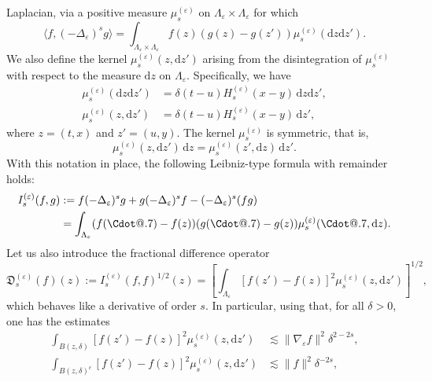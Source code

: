 \documentclass{article}
\makeatletter
\numberwithin{equation}{section}
\newcommand{\assign}{:=}
\newcommand{\mathd}{\mathrm{d}}
\newcommand*\Cdot{{\mathpalette\Cdot@{.7}}}
\newcommand*\Cdot@[2]{\mathbin{\vcenter{\hbox{\scalebox{#2}{\hspace{0.1mm}$\m@th#1\bullet$\hspace{0.1mm}}}}}}
\theoremstyle{plain}
\theoremstyle{definition}
\makeatother
\begin{document}
Laplacian, via a positive measure $\mu^{(\varepsilon)}_s$ on
$\Lambda_{\varepsilon} \times \Lambda_{\varepsilon}$ for which
\[ \langle f, (- \Delta_{\varepsilon})^s g \rangle =
   \int_{\Lambda_{\varepsilon} \times \Lambda_{\varepsilon}} f (z)  (g (z) - g
   (z')) \mu^{(\varepsilon)}_s (\mathd z \mathd z') . \]
We also define the kernel $\mu^{(\varepsilon)}_s (z, \mathd z')$ arising from
the disintegration of $\mu^{(\varepsilon)}_s$ with respect to the measure
$\mathd z$ on $\Lambda_{\varepsilon}$. Specifically, we have
\begin{equation}\begin{aligned}
  \mu^{(\varepsilon)}_s (\mathd z \mathd z') &= \delta (t - u)
  H^{(\varepsilon)}_s (x - y)\,\mathd z \mathd z', \\ \mu^{(\varepsilon)}_s
  (z, \mathd z') &= \delta (t - u) H^{(\varepsilon)}_s (x - y)\,\mathd z',
  \end{aligned}\label{eq:int-kernel}\end{equation}
where $z = (t, x)$ and $z' = (u, y) .$ The kernel $\mu^{(\varepsilon)}_s$ is
symmetric, that is,
\[ \mu^{(\varepsilon)}_s (z, \mathd z')\,\mathd z = \mu^{(\varepsilon)}_s (z',
   \mathd z)\,\mathd z' . \]
With this notation in place, the following Leibniz-type
formula with remainder holds:
\begin{equation}
  \begin{aligned}
    I^{(\varepsilon)}_s (f, g)
    &\assign f (- \Delta_{\varepsilon})^s g + g (- \Delta_{\varepsilon})^s f
    - (- \Delta_{\varepsilon})^s (f g)\\
    &= \int_{\Lambda_{\varepsilon}} (f (\Cdot) - f (z))
    (g (\Cdot) - g (z))
    \mu^{(\varepsilon)}_{ s} (\Cdot, \mathd z) .
  \end{aligned}
  \label{def-I}
\end{equation}
Let us also introduce the fractional difference operator
\begin{equation}
  \mathfrak{D}^{(\varepsilon)}_s (f) (z) \assign
  I^{(\varepsilon)}_s (f, f)^{1 / 2} (z) = \left[ \int_{\Lambda_{\varepsilon}}
  [f (z') - f (z)]^2 \mu^{(\varepsilon)}_s (z, \mathd z') \right]^{1 / 2},
  \label{eq:D}
\end{equation}
which behaves like a derivative of order $s$. In particular, using that, for
all $\delta > 0$, one has the estimates
\begin{align*}
  \int_{B (z, \delta)} [f (z') - f (z)]^2
  \mu^{(\varepsilon)}_s (z, \mathd z')
  &\lesssim \| \nabla_{\varepsilon} f \|^2 \delta^{2 - 2 s},\\
  \int_{B (z, \delta)^c} [f (z') - f (z)]^2
  \mu^{(\varepsilon)}_s (z, \mathd z')
  &\lesssim \| f \|^2 \delta^{- 2 s},
\end{align*}
\end{document}
